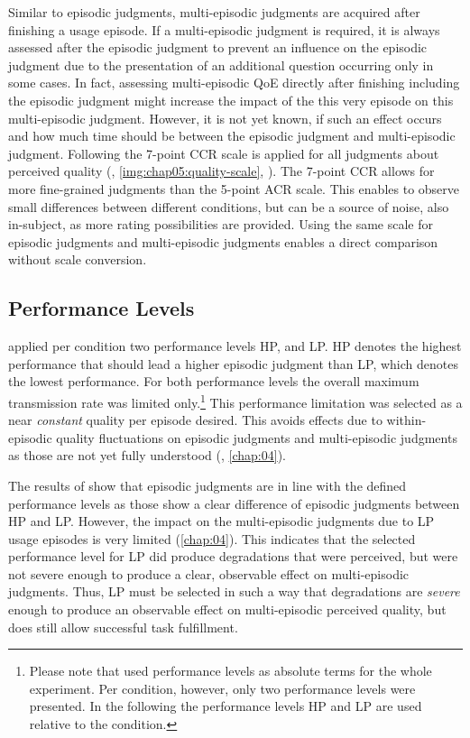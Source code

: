 Similar to episodic judgments, multi-episodic judgments are acquired after finishing a usage episode.
If a multi-episodic judgment is required, it is always assessed after the episodic judgment to prevent an influence on the episodic judgment due to the presentation of an additional question occurring only in some cases.
In fact, assessing multi-episodic \ac{QoE} directly after finishing including the episodic judgment might increase the impact of the this very episode on this multi-episodic judgment.
However, it is not yet known, if such an effect occurs and how much time should be between the episodic judgment and multi-episodic judgment.
Following \citet{moller_single-call_2011} the 7-point \ac{CCR} scale is applied for all judgments about perceived quality (\cf, \autoref{img:chap05:quality-scale}, ).
The 7-point \ac{CCR} allows for more fine-grained judgments than the 5-point \ac{ACR} scale.
This enables to observe small differences between different conditions, but can be a source of noise, also in-subject, as more rating possibilities are provided.
Using the same scale for episodic judgments and multi-episodic judgments enables a direct comparison without scale conversion.

\subsection{Performance Levels}
\citet{moller_single-call_2011} applied per condition two performance levels \acf{HP}, and \acf{LP}.
\ac{HP} denotes the highest performance that should lead a higher episodic judgment than \ac{LP}, which denotes the lowest performance.
For both performance levels the overall maximum transmission rate was limited only.\footnote{Please note that \citet{moller_single-call_2011} used performance levels as absolute terms for the whole experiment. Per condition, however, only two performance levels were presented. In the following the performance levels \ac{HP} and \ac{LP} are used relative to the condition.}
This performance limitation was selected as a near \emph{constant} quality per episode desired. %
This avoids effects due to within-episodic quality fluctuations on episodic judgments and multi-episodic judgments as those are not yet fully understood (\cf, \autoref{chap:04}).

The results of \cite{moller_single-call_2011} show that episodic judgments are in line with the defined performance levels as those show a clear difference of episodic judgments between \ac{HP} and \ac{LP}.
However, the impact on the multi-episodic judgments due to \ac{LP} usage episodes is very limited (\cf \autoref{chap:04}).
This indicates that the selected performance level for \ac{LP} did produce degradations that were perceived, but were not severe enough to produce a clear, observable effect on multi-episodic judgments.
Thus, \ac{LP} must be selected in such a way that degradations are \emph{severe} enough to produce an observable effect on multi-episodic perceived quality, but does still allow successful task fulfillment.

